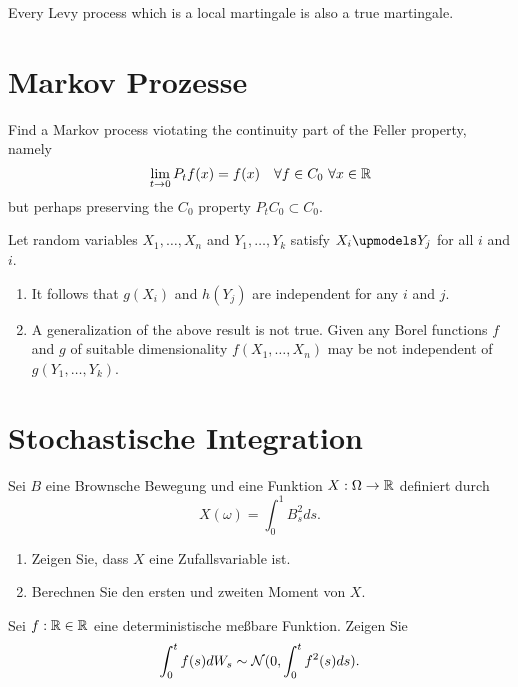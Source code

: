  Every Levy process which is a local martingale is
also a true martingale.



\section{Markov Prozesse}

Find a Markov process viotating the continuity part of 
the Feller property, namely
\begin{equation}
\lim_{t\to 0} P_t f(x) = f(x) \quad \forall f \in C_0 \ \forall x\in \mathbb R
\end{equation}
but perhaps preserving the $C_0$ property $P_t C_0 \subset C_0$.



 Let random variables
$X_1,\ldots,X_n$ and $Y_1,\ldots,Y_k$ satisfy $X_i \upmodels Y_j$ for all $i$
and $i$.
\begin{enumerate}
    \item It follows that $g(X_i)$ and $h(Y_j)$ are independent for any $i$ and
        $j$.
    \item A generalization of the above result is not true. Given any Borel
        functions $f$ and $g$ of suitable dimensionality $f(X_1,\ldots,X_n)$
        may be not independent of $g(Y_1,\ldots,Y_k)$.
\end{enumerate}



\section{Stochastische Integration}

Sei $B$ eine Brownsche Bewegung und eine Funktion $X:\Omega\to\mathbb R$ definiert durch
\begin{equation*}
    X(\omega) = \int_{0}^{1} B_s^{2} ds. 
\end{equation*}
\begin{enumerate}
    \item Zeigen Sie, dass $X$ eine Zufallsvariable ist.
    \item Berechnen Sie den ersten und zweiten Moment von $X$. 
\end{enumerate}



 Sei
$f: \mathbb R\in\mathbb R$ eine deterministische meßbare Funktion. Zeigen Sie 
\begin{equation}
    \int_{0}^{t} f(s) d W_s \sim \mathcal N(0, \int_{0}^{t} f^2(s) ds). 
\end{equation}









